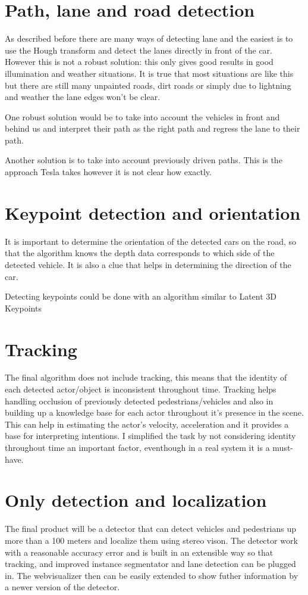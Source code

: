 \section{Path, lane and road detection}

As described before there are many ways of detecting lane and the easiest is to
use the Hough transform and detect the lanes directly in front of the car.
However this is not a robust solution: this only gives good results in good
illumination and weather situations. It is true that most situations are like
this but there are still many unpainted roads, dirt roads or simply due to
lightning and weather the lane edges won't be clear.

One robust solution would be to take into account the vehicles in front and
behind us and interpret their path as the right path and regress the lane to
their path. 

Another solution is to take into account previously driven paths. This is the
approach Tesla takes however it is not clear how exactly.

\section{Keypoint detection and orientation}

It is important to determine the orientation of the detected cars on the road,
so that the algorithm knows the depth data corresponds to which side of the
detected vehicle. It is also a clue that helps in determining the direction
of the car.

Detecting keypoints could be done with an algorithm similar to Latent 3D
Keypoints\cite{suwajanakorn_discovery_2018}

\section{Tracking}

The final algorithm does not include tracking, this means that the identity of
each detected actor/object is inconsistent throughout time. Tracking helps
handling occlusion of previously detected pedestrians/vehicles and also in
building up a knowledge base for each actor throughout it's presence in the
scene. This can help in estimating the actor's velocity, acceleration and it
provides a base for interpreting intentions. I simplified the task by not
considering identity throughout time an important factor, eventhough in a real
system it is a must-have.

\section{Only detection and localization}

The final product will be a detector that can detect vehicles and pedestrians up
more than a 100 meters and localize them using stereo vison. The detector work
with a reasonable accuracy error and is built in an extensible way so that
tracking, and improved instance segmentator and lane detection can be plugged
in. The webvisualizer then can be easily extended to show futher information by
a newer version of the detector.